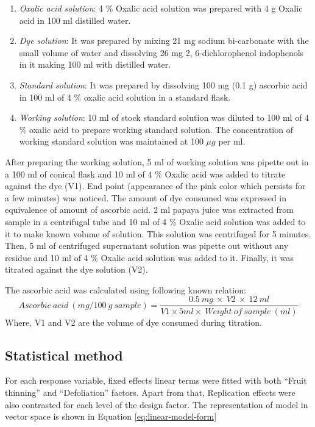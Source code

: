 \documentclass[]{article}
\providecommand{\tightlist}{%
  \setlength{\itemsep}{0pt}\setlength{\parskip}{0pt}}
\begin{document}
\begin{enumerate}
\def\labelenumi{\arabic{enumi}.}
\tightlist
\item
  \emph{Oxalic acid solution}: 4 \% Oxalic acid solution was prepared
  with 4 g Oxalic acid in 100 ml distilled water.
\item
  \emph{Dye solution}: It was prepared by mixing 21 mg sodium
  bi-carbonate with the small volume of water and dissolving 26 mg 2,
  6-dichlorophenol indophenols in it making 100 ml with distilled water.
\item
  \emph{Standard solution}: It was prepared by dissolving 100 mg (0.1 g)
  ascorbic acid in 100 ml of 4 \% oxalic acid solution in a standard
  flask.
\item
  \emph{Working solution}: 10 ml of stock standard solution was diluted
  to 100 ml of 4 \% oxalic acid to prepare working standard solution.
  The concentration of working standard solution was maintained at 100
  \(\mu g\) per ml.
\end{enumerate}

After preparing the working solution, 5 ml of working solution was
pipette out in a 100 ml of conical flask and 10 ml of 4 \% Oxalic acid
was added to titrate against the dye (V1). End point (appearance of the
pink color which persists for a few minutes) was noticed. The amount of
dye consumed was expressed in equivalence of amount of ascorbic acid. 2
ml papaya juice was extracted from sample in a centrifugal tube and 10
ml of 4 \% Oxalic acid solution was added to it to make known volume of
solution. This solution was centrifuged for 5 minutes. Then, 5 ml of
centrifuged supernatant solution was pipette out without any residue and
10 ml of 4 \% Oxalic acid solution was added to it. Finally, it was
titrated against the dye solution (V2).

The ascorbic acid was calculated using following known relation:
\[Ascorbic~acid~(mg/100~g~sample) = \frac{0.5~mg~\times~V2~\times~12~ml}{V1\times 5ml\times~Weight~of~sample~(ml)}\]
Where, V1 and V2 are the volume of dye consumed during titration.

\subsection{Statistical method}\label{statistical-method}

For each response variable, fixed effects linear terms were fitted with
both ``Fruit thinning'' and ``Defoliation'' factors. Apart from that,
Replication effects were also contrasted for each level of the design
factor. The representation of model in vector space is shown in Equation
\eqref{eq:linear-model-form}
\end{document}
